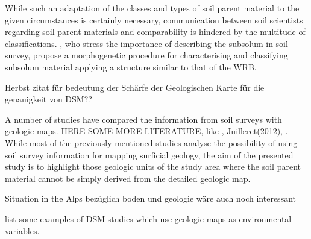 \documentclass[preprint,12pt,authoryear]{elsarticle}
\begin{document}
While such an adaptation of the classes and types of soil parent material to the given circumstances is certainly necessary, communication between soil scientists regarding soil parent materials and comparability is hindered by the multitude of classifications. \cite{Juilleret2016}, who stress the importance of describing the subsolum in soil survey, propose a morphogenetic procedure for characterising and classifying subsolum material applying a structure similar to that of the WRB.

Herbst zitat für bedeutung der Schärfe der Geologischen Karte für die genauigkeit von DSM??



A number of studies have compared the information from soil surveys with geologic maps. HERE SOME MORE LITERATURE, like \cite{Miller2015a}, Juilleret(2012), \cite{Brevik2015}. While most of the previously mentioned studies analyse the possibility of using soil survey information for mapping surficial geology, the aim of the presented study is to highlight those geologic units of the study area where the soil parent material cannot be simply derived from the detailed geologic map.




 {Situation in the Alps bez{\"u}glich boden und geologie w{\"a}re auch noch interessant}

\cite{McBratney2003} list some examples of DSM studies which use geologic maps as environmental variables.
\end{document}
